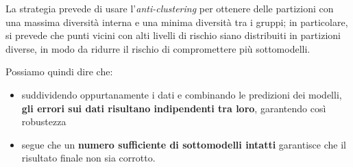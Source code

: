 \documentclass{report}
\begin{document}
\noindent La strategia prevede di usare l'\textit{anti-clustering} per ottenere delle partizioni con una massima diversità interna e una 
minima diversità tra i gruppi; in particolare, si prevede che punti vicini con alti livelli di rischio siano distribuiti in partizioni 
diverse, in modo da ridurre il rischio di compromettere più sottomodelli. 

\noindent Possiamo quindi dire che:
\begin{itemize}
    \item suddividendo oppurtanamente i dati e combinando le predizioni dei modelli, \textbf{gli errori sui dati risultano indipendenti tra loro}, garantendo così robustezza 
    \item segue che un \textbf{numero sufficiente di sottomodelli intatti} garantisce che il risultato finale non sia corrotto.
\end{itemize}
\end{document}
